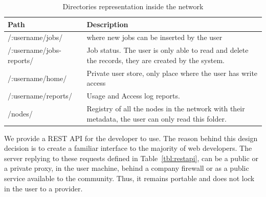 \begin{table}
  \begin{tabular}{ p{3cm} | p{9cm} }
  Path & Description \\
  \hline 
  /:username/jobs/ & where new jobs can be inserted by the user \\
  \hline
  /:username/jobs-reports/ & Job status. The user is only able to read and delete the records, they are created by the system. \\
  \hline 
  /:username/home/ &  Private user store, only place where the user has write access \\
  \hline   
  /:username/reports/ & Usage and Access log reports. \\ 
  \hline   
  /nodes/ & Registry of all the nodes in the network with their metadata, the user can only read this folder. \\
  \end{tabular}
  \caption{Directories representation inside the network}
  \label{tbl:dirrepnet}
\end{table}

We provide a REST API for the developer to use. The reason behind this design decision is to create a familiar interface to the majority of web developers. The server replying to these requests defined in Table~\ref{tbl:restapi}, can be a public or a private proxy, in the user machine, behind a company firewall or as a public service available to the community. Thus, it remains portable and does not lock in the user to a provider.

